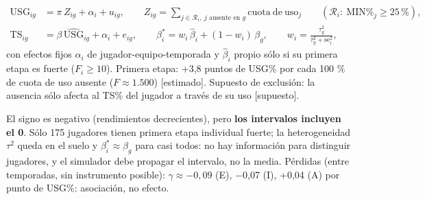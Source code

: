\documentclass[10pt,a4paper]{article}
\begin{document}
\[
\begin{aligned} \mathrm{USG}_{ig} &= \pi\, Z_{ig} + \alpha_i + u_{ig}, \qquad Z_{ig} = \sum_{j \in \mathcal R_i,\ j \text{ ausente en } g} \mathrm{cuota\ de\ uso}_j \qquad (\mathcal R_i:\ \mathrm{MIN\%}_j \ge 25\,\%),\\ \mathrm{TS}_{ig} &= \beta\,\widehat{\mathrm{USG}}_{ig} + \alpha_i + e_{ig}, \qquad \beta_i^{*} = w_i\,\hat\beta_i + (1-w_i)\,\beta_g, \qquad w_i = \frac{\tau_g^2}{\tau_g^2 + \mathrm{se}_i^2} , \end{aligned}
\]
con efectos fijos $\alpha_i$ de jugador-equipo-temporada y $\hat\beta_i$ propio sólo si su primera etapa es fuerte ($F_i \ge 10$). Primera etapa: +3,8 puntos de USG\% por cada 100 \% de cuota de uso ausente ($F \approx 1.500$) [estimado]. Supuesto de exclusión: la ausencia sólo afecta al TS\% del jugador a través de su uso [supuesto].

\begin{center}\small
{}
\end{center}
El signo es negativo (rendimientos decrecientes), pero \textbf{los intervalos incluyen el 0}. Sólo 175 jugadores tienen primera etapa individual fuerte; la heterogeneidad $\tau^2$ queda en el suelo y $\beta_i^{*} \approx \beta_g$ para casi todos: no hay información para distinguir jugadores, y el simulador debe propagar el intervalo, no la media. Pérdidas (entre temporadas, sin instrumento posible): $\gamma \approx -0{,}09$ (E), \ensuremath{-}0,07 (I), +0,04 (A) por punto de USG\%: asociación, no efecto.
\end{document}
